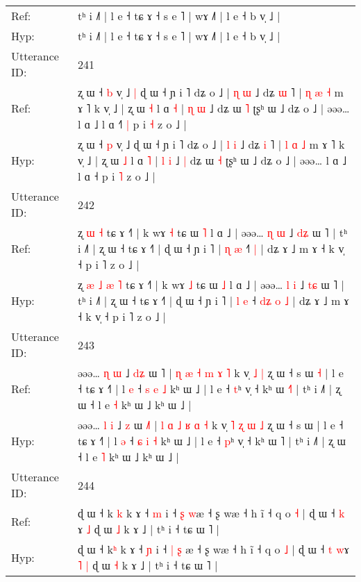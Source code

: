 \documentclass[10pt]{article}
\DeclareRobustCommand{\hl}[1]{{\textcolor{red}{#1}}}
\begin{document}
\begin{longtable}{ll}
Ref: & tʰ i ˩˥ | l e ˧ tɕ ɤ ˧ s e ˥ | wɤ ˩˥ | l e ˧ b v̩ ˩ |
 \\
Hyp: & tʰ i ˩˥ | l e ˧ tɕ ɤ ˧ s e ˥ | wɤ ˩˥ | l e ˧ b v̩ ˩ |
 \\
\midrule
Utterance ID: & 241 \\
Ref: & ʐ ɯ ˧ \hl{b} v̩ ˩\hl{ }\hl{|} ɖ ɯ ˧ ɲ i ˥ dʑ o ˩ | \hl{ɳ} \hl{ɯ} ˩ dʑ \hl{ɯ} ˥ | \hl{ɳ} \hl{æ} \hl{˧} m ɤ ˥ k v̩ ˩ | ʐ ɯ \hl{˧} l ɑ \hl{˧} | \hl{ɳ} \hl{ɯ} ˩\hl{}\hl{} dʑ ɯ \hl{˥} ʈʂʰ ɯ ˩ dʑ o ˩ | əəə… l ɑ ˩ l ɑ ˧\hl{˥}\hl{ }\hl{|} p i \hl{˧} z o ˩ |
 \\
Hyp: & ʐ ɯ ˧ \hl{p} v̩ ˩\hl{}\hl{} ɖ ɯ ˧ ɲ i ˥ dʑ o ˩ | \hl{l} \hl{i} ˩ dʑ \hl{i} ˥ | \hl{l} \hl{ɑ} \hl{˩} m ɤ ˥ k v̩ ˩ | ʐ ɯ \hl{˩} l ɑ \hl{˥} | \hl{l} \hl{i} ˩\hl{ }\hl{|} dʑ ɯ \hl{˧} ʈʂʰ ɯ ˩ dʑ o ˩ | əəə… l ɑ ˩ l ɑ ˧\hl{}\hl{}\hl{} p i \hl{˥} z o ˩ |
 \\
\midrule
Utterance ID: & 242 \\
Ref: & ʐ\hl{}\hl{}\hl{}\hl{} \hl{ɯ} \hl{˧} tɕ ɤ ˧˥ | k wɤ \hl{˧} tɕ ɯ \hl{˥} l ɑ ˩ | əəə… \hl{ɳ} \hl{ɯ} ˩ \hl{d}\hl{ʑ} ɯ ˥ | tʰ i ˩˥ | ʐ ɯ ˧ tɕ ɤ ˧˥ | ɖ ɯ ˧ ɲ i ˥ | \hl{ɳ} \hl{æ} ˧\hl{}\hl{}\hl{}\hl{}\hl{˥} \hl{|} | dʑ ɤ ˩ m ɤ ˧ k v̩ ˧ p i ˥ z o ˩ |
 \\
Hyp: & ʐ\hl{ }\hl{æ}\hl{ }\hl{˩} \hl{æ} \hl{˥} tɕ ɤ ˧˥ | k wɤ \hl{˩} tɕ ɯ \hl{˩} l ɑ ˩ | əəə… \hl{l} \hl{i} ˩ \hl{t}\hl{ɕ} ɯ ˥ | tʰ i ˩˥ | ʐ ɯ ˧ tɕ ɤ ˧˥ | ɖ ɯ ˧ ɲ i ˥ | \hl{l} \hl{e} ˧\hl{ }\hl{d}\hl{ʑ}\hl{ }\hl{o} \hl{˩} | dʑ ɤ ˩ m ɤ ˧ k v̩ ˧ p i ˥ z o ˩ |
 \\
\midrule
Utterance ID: & 243 \\
Ref: & əəə… \hl{ɳ} \hl{ɯ} ˩ \hl{d}\hl{ʑ} ɯ \hl{}˥ | \hl{ɳ} \hl{æ} \hl{˧} \hl{m} \hl{ɤ} \hl{˥} k v̩\hl{}\hl{}\hl{}\hl{} \hl{˩} \hl{|} ʐ ɯ ˧ s ɯ\hl{ }\hl{˧} | l e ˧ tɕ ɤ ˧˥ | l \hl{e} ˧ \hl{s} \hl{e} \hl{˩} kʰ ɯ ˩ | l e ˧ \hl{t}ʰ v̩ ˧ kʰ ɯ \hl{˧}˥ | tʰ i ˩˥ | ʐ ɯ ˧ l e \hl{˧} kʰ ɯ ˩ kʰ ɯ ˩ |
 \\
Hyp: & əəə… \hl{l} \hl{i} ˩ \hl{}\hl{z} ɯ \hl{˩}˥ | \hl{l} \hl{ɑ} \hl{˩} \hl{ʁ} \hl{ɑ} \hl{˧} k v̩\hl{ }\hl{˥}\hl{ }\hl{ʐ} \hl{ɯ} \hl{˩} ʐ ɯ ˧ s ɯ\hl{}\hl{} | l e ˧ tɕ ɤ ˧˥ | l \hl{ə} ˧ \hl{ɕ} \hl{i} \hl{˧} kʰ ɯ ˩ | l e ˧ \hl{p}ʰ v̩ ˧ kʰ ɯ \hl{}˥ | tʰ i ˩˥ | ʐ ɯ ˧ l e \hl{˥} kʰ ɯ ˩ kʰ ɯ ˩ |
 \\
\midrule
Utterance ID: & 244 \\
Ref: & ɖ ɯ ˧ k\hl{ }\hl{k} k ɤ ˧ \hl{m} i ˧ \hl{ʂ} \hl{}\hl{w}æ ˧ ʂ wæ ˧ h ĩ ˧ q o \hl{˧} | ɖ ɯ ˧ \hl{k} \hl{}ɤ\hl{}\hl{} \hl{˩} ɖ ɯ \hl{˩} k ɤ ˩ | tʰ i ˧ tɕ ɯ ˥ |
 \\
Hyp: & ɖ ɯ ˧ k\hl{}\hl{ʰ} k ɤ ˧ \hl{ɲ} i ˧ \hl{|} \hl{ʂ}\hl{ }æ ˧ ʂ wæ ˧ h ĩ ˧ q o \hl{˩} | ɖ ɯ ˧ \hl{t} \hl{w}ɤ\hl{ }\hl{˥} \hl{|} ɖ ɯ \hl{˧} k ɤ ˩ | tʰ i ˧ tɕ ɯ ˥ |

\end{longtable}
\end{document}
